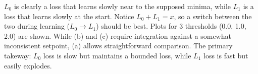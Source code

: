 \documentclass[12pt]{iopart}
\theoremstyle{break}
\begin{document}
\begin{figure}[htpb]
\centering

\qquad
{}
\qquad
{}

\end{figure}

$L_0$ is clearly a loss that learns slowly near to the supposed minima, while $L_1$ is a loss that learns slowly at the start.
Notice $L_0 + L_1 = x$, so a switch between the two during learning ($L_0 \rightarrow L_1$) should be best.
Plots for 3 thresholds (0.0, 1.0, 2.0) are shown. While (b) and (c) require integration against a somewhat inconsistent setpoint, (a) allows straightforward comparison.
The primary takeway: $L_0$ loss is slow but maintains a bounded loss, while $L_1$ loss is fast but easily explodes.
	
\end{document}
